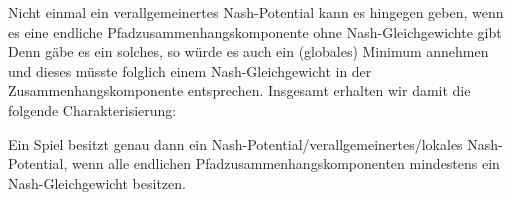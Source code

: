 Nicht einmal ein verallgemeinertes Nash-Potential kann es hingegen geben, wenn es eine endliche Pfadzusammenhangskomponente ohne Nash-Gleichgewichte gibt Denn gäbe es ein solches, so würde es auch ein (globales) Minimum annehmen und dieses müsste folglich einem Nash-Gleichgewicht in der Zusammenhangskomponente entsprechen. Insgesamt erhalten wir damit die folgende Charakterisierung:

\begin{satz}\label{kor:CharExNashPot}
	Ein Spiel besitzt genau dann ein Nash-Potential/verallgemeinertes/lokales Nash-Potential, wenn alle endlichen Pfadzusammenhangskomponenten mindestens ein Nash-Gleichgewicht besitzen.
\end{satz}

